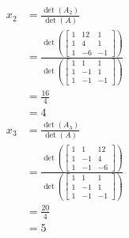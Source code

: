 \begin{example}
  \begin{align*}
    x_2 &= \frac{\det(A_2)}{\det(A)} \\
    &= \frac{\det(\begin{bmatrix}
      1 & 12 & 1 \\
      1 & 4 & 1 \\
      1 & -6 & -1
    \end{bmatrix} )}{\det(\begin{bmatrix}
      1 & 1 & 1 \\
      1 & -1 & 1 \\
      1 & -1 & -1
    \end{bmatrix} )} \\
    &= \frac{16}{4} \\
    &= 4
  \end{align*}
  \begin{align*}
    x_3 &= \frac{\det(A_3)}{\det(A)} \\
    &= \frac{\det(\begin{bmatrix}
      1 & 1 & 12 \\
      1 & -1 & 4 \\
      1 & -1 & -6
    \end{bmatrix} )}{\det(\begin{bmatrix}
      1 & 1 & 1 \\
      1 & -1 & 1 \\
      1 & -1 & -1
    \end{bmatrix} )} \\
    &= \frac{20}{4} \\
    &= 5
  \end{align*}
\end{example}


